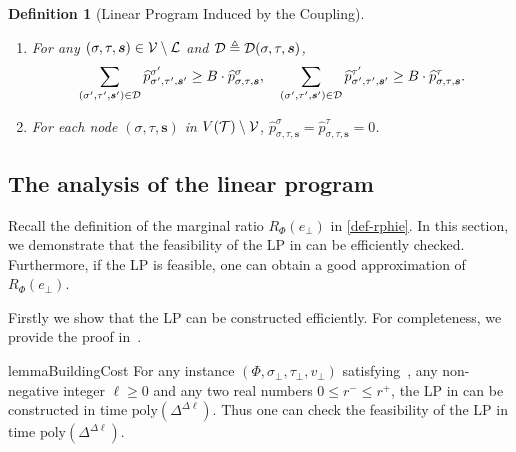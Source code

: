\documentclass[11pt]{article}
\newtheorem{definition}[theorem]{Definition}
\def\poly{\mathrm{poly}}
\newcommand{\seqS}{\boldsymbol{s}}
\begin{document}
\begin{definition}[Linear Program Induced by the Coupling]
\begin{enumerate}
            \begin{align}\label{eqn-hat-ratio}
                 \frac{ \mu(\tau)}{ \mu(\sigma)}\cdot r^-\cdot {\widehat{p}^{\tau}_{\sigma,\tau, \seqS}}\leq {\widehat{p}^{\sigma}_{\sigma,\tau, \seqS}}\leq  \frac{ \mu(\tau)}{ \mu(\sigma)}\cdot  r^+ \cdot{\widehat{p}^{\tau}_{\sigma,\tau, \seqS}}.
            \end{align}\label{item-forth-LP}
        \item For any $(\sigma,\tau, \seqS)\in \+V\setminus \+L$ and $\+D \triangleq \+D(\sigma,\tau, \seqS)$,
           \begin{align}\label{eqn-hat-error-bound}
               \sum_{(\sigma',\tau',\seqS')\in \+D}\widehat{p}^{\sigma'}_{\sigma',\tau', \seqS'} \geq  B \cdot \widehat{p}^{\sigma}_{\sigma,\tau, \seqS}, \quad \sum_{(\sigma',\tau',\seqS')\in \+D}\widehat{p}^{\tau'}_{\sigma',\tau',\seqS'}\geq  B \cdot \widehat{p}^{\tau}_{\sigma,\tau,\seqS}.
           \end{align}\label{item-fifth-LP}
        \item  For each node $(\sigma, \tau, \seqS)$ in $V(\mathcal{T})\setminus \mathcal{V}$, $ \widehat{p}^{\sigma}_{\sigma,\tau, \seqS}= \widehat{p}^{\tau}_{\sigma,\tau, \seqS}=0$. \label{item-sixth-LP}
    \end{enumerate}
\end{definition}


\subsection{The analysis of the linear program}
Recall the definition of the marginal ratio $R_{\Phi}(e_\bot)$ in \eqref{def-rphie}. In this section, 
we demonstrate that the feasibility of the LP in  can be efficiently checked. Furthermore, if the LP is feasible, one can obtain a good approximation of $R_{\Phi}(e_\bot)$.


Firstly we show that the LP can be constructed efficiently. For completeness, we provide the proof in~.
\begin{restatable}{lemma}{BuildingCost} 
\label{lem:building-cost-of-LP}
    For any instance $(\Phi, \sigma_\bot, \tau_\bot, v_\bot)$ satisfying~, any non-negative integer $\ell \ge 0$ and any two real numbers $0 \le r^- \le r^+$,
    the LP in  can be constructed in time $\poly\left(\Delta^{\Delta \ell}\right)$. Thus one can check the feasibility of the LP in time $\poly\left(\Delta^{\Delta \ell}\right)$.
\end{restatable}
\end{document}
